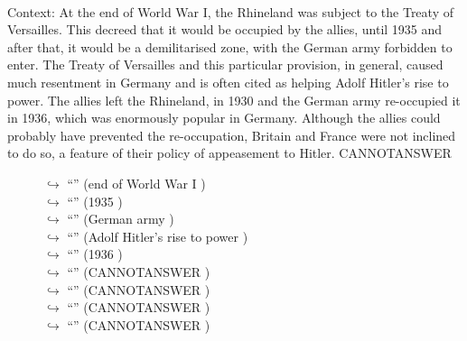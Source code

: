 \documentclass[11pt,a4paper, onecolumn]{article}
\begin{document}
\\ Context: At the end of World War I, the Rhineland was subject to the Treaty of Versailles. This decreed that it would be occupied by the allies, until 1935 and after that, it would be a demilitarised zone, with the German army forbidden to enter. The Treaty of Versailles and this particular provision, in general, caused much resentment in Germany and is often cited as helping Adolf Hitler's rise to power. The allies left the Rhineland, in 1930 and the German army re-occupied it in 1936, which was enormously popular in Germany. Although the allies could probably have prevented the re-occupation, Britain and France were not inclined to do so, a feature of their policy of appeasement to Hitler. CANNOTANSWER

\begin{figure}[t] \small \begin{tcolorbox}[boxsep=0pt,left=5pt,right=0pt,top=2pt,colback = yellow!5] \begin{dialogue}
 \small 
\colorbox{pink!25}{$\hookrightarrow$}
{ ``'' (end of World War I ) }
\\
\colorbox{pink!25}{$\hookrightarrow$}
{ ``'' (1935 ) }
\\
\colorbox{pink!25}{$\hookrightarrow$}
{ ``'' (German army ) }
\\
\colorbox{pink!25}{$\hookrightarrow$}
{ ``'' (Adolf Hitler's rise to power ) }
\\
\colorbox{pink!25}{$\hookrightarrow$}
{ ``'' (1936 ) }
\\
\colorbox{pink!25}{$\hookrightarrow$}
{ ``'' (CANNOTANSWER ) }
\\
\colorbox{pink!25}{$\hookrightarrow$}
{ ``'' (CANNOTANSWER ) }
\\
\colorbox{pink!25}{$\hookrightarrow$}
{ ``'' (CANNOTANSWER ) }
\\
\colorbox{pink!25}{$\hookrightarrow$}
{ ``'' (CANNOTANSWER ) }
\\
 \end{dialogue}\end{tcolorbox}\end{figure}
\end{document}
